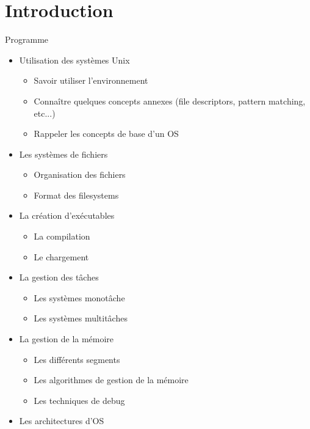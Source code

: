 %
%
%

\part{Introduction}

\begin{frame}[fragile=singleslide]{Programme}
  \begin{itemize} 
  \item Utilisation des systèmes Unix
    \begin{itemize}
    \item Savoir utiliser l'environnement
    \item  Connaître  quelques  concepts  annexes  (file  descriptors,
      pattern matching, etc...)
    \item Rappeler les concepts de base d'un OS
    \end{itemize}
  \item Les systèmes de fichiers
    \begin{itemize}
      \item Organisation des fichiers
      \item Format des filesystems
    \end{itemize}
  \item La création d'exécutables
    \begin{itemize} 
    \item La compilation
    \item Le chargement
    \end{itemize}
  \item La gestion des tâches
    \begin{itemize}
    \item Les systèmes monotâche
    \item Les systèmes multitâches 
    \end{itemize}
  \item La gestion de la mémoire
    \begin{itemize}
    \item Les différents segments
    \item Les algorithmes de gestion de la mémoire
    \item Les techniques de debug
    \end{itemize}
  \item Les architectures d'OS
  \end{itemize}
\end{frame}
